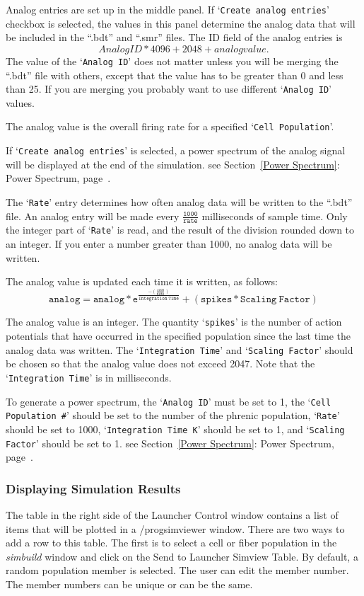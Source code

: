 \documentclass[12pt,openany,oneside]{book}
\newcommand{\tmcode}[1]{\mathtt{#1}}
\newcommand{\tisamp}[1]{`\texttt{#1}'}
\newcommand{\tixref}[1]{see Section~\ref{#1}: #1, page~\pageref{#1}}
\newcommand{\prog}[1]{\textit{{#1}}}
\newcommand{\ext}[1]{{{``.#1''}}}
\begin{document}
Analog entries are set up in the middle panel. If \tisamp{Create analog
entries} checkbox is selected, the values in this panel determine the
analog data that will be included in the \ext{bdt}  and \ext{smr} files.
The ID field of the analog entries is \[Analog ID * 4096 + 2048 + analog
value.\]  The value of the \tisamp{Analog ID} does not matter unless you
will be merging the \ext{bdt} file with others, except that the value has
to be greater than 0 and less than 25. If you are merging you probably
want to use different \tisamp{Analog ID} values.

The analog value is the overall firing rate for a specified \tisamp{Cell
Population}.

If \tisamp{Create analog entries} is selected, a power spectrum of the
analog signal will be displayed at the end of the simulation.
\tixref{Power Spectrum}.

The \tisamp{Rate} entry determines how often analog data will be written
to the \ext{bdt} file. An analog entry will be made every
$\tmcode{\tfrac{1000}{rate}}$ milliseconds of sample time. Only the integer
part of \tisamp{Rate} is read, and the result of the division rounded down
to an integer. If you enter a number greater than 1000, no analog data
will be written.

The analog value is updated each time it is written, as follows:
$$
\tmcode{ analog = analog * e^{\tfrac{-{\left (\tfrac{1000}{Rate}\right
)}}{Integration\ Time}} + (spikes * Scaling\ Factor)}
$$

The analog value is an integer. The
quantity \tisamp{spikes} is the number of action potentials that have
occurred in the specified population since the last time the analog
data was written. The \tisamp{Integration Time} and \tisamp{Scaling
Factor} should be chosen so that the analog value does not exceed
2047. Note that the \tisamp{Integration Time} is in milliseconds.

To generate a power spectrum, the \tisamp{Analog ID} must be set to 1,
the \tisamp{Cell Population \#} should be set to the number of the
phrenic population, \tisamp{Rate} should be set to 1000,
\tisamp{Integration Time K} should be set to 1, and \tisamp{Scaling
Factor} should be set to 1. \tixref{Power Spectrum}.

\subsubsection{Displaying Simulation Results}

The table in the right side of the Launcher Control window contains a list
of items that will be plotted in a /prog{simviewer} window. There are two
ways to add a row to this table. The first is to select a cell 
or fiber population
in the \prog{simbuild} window and click on the Send to Launcher Simview
Table.  By default, a random population member is selected. The user can
edit the member number. The member numbers can be unique or can be the
same.
\end{document}
